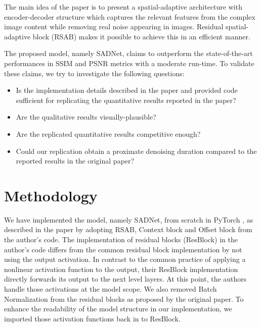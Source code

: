 The main idea of the paper is to present a spatial-adaptive architecture with encoder-decoder structure which captures the relevant features from the complex image content while removing real noise appearing in images. Residual spatial-adaptive block (RSAB) makes it possible to achieve this in an efficient manner.  

The proposed model, namely SADNet, claims to outperform the state-of-the-art performances in SSIM and PSNR metrics with a moderate run-time. To validate these claims, we try to investigate the following questions:
\begin{itemize}
			\item Is the implementation details described in the paper and provided code sufficient for replicating the quantitative results reported in the paper?
			\item Are the qualitative results visually-plausible?
			\item Are the replicated quantitative results competitive enough?  
            \item Could our replication obtain a proximate denoising duration compared to the reported results in the original paper? 
\end{itemize}


\section{Methodology}

We have implemented the model, namely SADNet, from scratch in PyTorch \cite{NEURIPS2019_9015}, as described in the paper by adopting RSAB, Context block and Offset block from the author's code. The implementation of residual blocks (ResBlock) in the author's code differs from the common residual block implementation \cite{7780459} by not using the output activation. In contrast to the common practice of applying a nonlinear activation function to the output, their ResBlock implementation directly forwards its output to the next level layers. At this point, the authors handle those activations at the model scope. We also removed Batch Normalization \cite{pmlr-v37-ioffe15} from the residual blocks as proposed by the original paper. To enhance the readability of the model structure in our implementation, we imported those activation functions back in to ResBlock.

